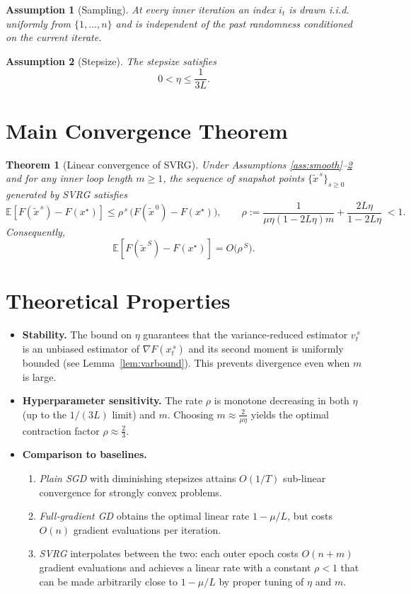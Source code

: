 \documentclass{article}
\newtheorem{theorem}{Theorem}[section]
\newtheorem{assumption}{Assumption}[section]
\begin{document}
\begin{assumption}[Sampling]\label{ass:sampling}
At every inner iteration an index $i_t$ is drawn i.i.d. uniformly from $\{1,\dots,n\}$ and is independent of the past randomness conditioned on the current iterate.
\end{assumption}

\begin{assumption}[Stepsize]\label{ass:stepsize}
The stepsize satisfies
\[
0<\eta\le\frac{1}{3L}.
\]
\end{assumption}

\section*{Main Convergence Theorem}
\begin{theorem}[Linear convergence of SVRG]\label{thm:linear}
Under Assumptions \ref{ass:smooth}–\ref{ass:stepsize} and for any inner loop length $m\ge 1$, the sequence of snapshot points $\{\tilde{x}^{\,s}\}_{s\ge0}$ generated by SVRG satisfies
\[
\mathbb{E}\!\left[F(\tilde{x}^{\,s})-F(x^\star)\right]
\le\rho^{\,s}\,\bigl(F(\tilde{x}^{\,0})-F(x^\star)\bigr),
\qquad
\rho:=\frac{1}{\mu\eta(1-2L\eta)m}+ \frac{2L\eta}{1-2L\eta}\;<1 .
\]
Consequently,
\[
\mathbb{E}\!\left[F(\tilde{x}^{\,S})-F(x^\star)\right]=O\!\bigl(\rho^{\,S}\bigr).
\]
\end{theorem}

\section*{Theoretical Properties}
\begin{itemize}
\item \textbf{Stability.} The bound on $\eta$ guarantees that the variance‑reduced estimator $v_t^{\,s}$ is an unbiased estimator of $\nabla F(x_{t}^{\,s})$ and its second moment is uniformly bounded (see Lemma~\ref{lem:varbound}). This prevents divergence even when $m$ is large.

\item \textbf{Hyperparameter sensitivity.} The rate $\rho$ is monotone decreasing in both $\eta$ (up to the $1/(3L)$ limit) and $m$. Choosing $m\approx\frac{2}{\mu\eta}$ yields the optimal contraction factor $\rho\approx\frac{2}{3}$.

\item \textbf{Comparison to baselines.}
\begin{enumerate}
\item \emph{Plain SGD} with diminishing stepsizes attains $O(1/T)$ sub‑linear convergence for strongly convex problems.
\item \emph{Full‑gradient GD} obtains the optimal linear rate $1-\mu/L$, but costs $O(n)$ gradient evaluations per iteration.
\item \emph{SVRG} interpolates between the two: each outer epoch costs $O(n+m)$ gradient evaluations and achieves a linear rate with a constant $\rho<1$ that can be made arbitrarily close to $1-\mu/L$ by proper tuning of $\eta$ and $m$.
\end{enumerate}
\end{itemize}
\end{document}
